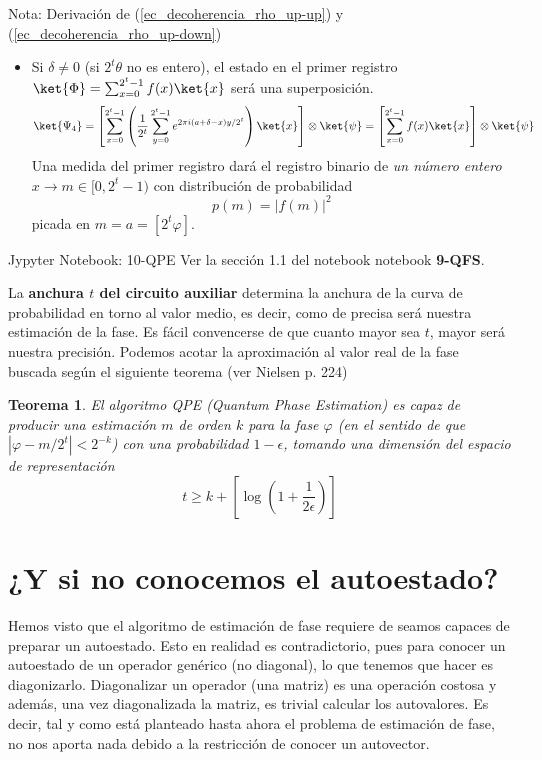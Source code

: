 \documentclass[a4paper,11pt]{book} %
\newtheorem{teorema_contador}{Teorema}
\newcommand{\Teorema}[1]{
		\begin{mybox_gray2}{}
			\begin{teorema_contador}
				 #1 
			\end{teorema_contador} 
		\end{mybox_gray2}
	}
\numberwithin{equation}{chapter}
\def\lc{\left[}
\def\rc{\right]}
\begin{document}
\begin{mybox_blue}{Nota: Derivación de (\ref{ec_decoherencia_rho_up-up}) y  (\ref{ec_decoherencia_rho_up-down})}
\begin{enumerate}
\begin{itemize}
		\item Si $\delta \neq 0$ (si $2^t \theta$ no es entero), el estado en el primer registro  $\ket{\Phi} = \sum_{x=0}^{2^t-1} f(x) \ket{x}$ será una superposición.
			$$
			\ket{\Psi_4} = \lc \sum_{x=0}^{2^t-1} \left( \frac{1}{2^{t}}\sum_{y=0}^{2^t-1}  e^{2\pi i (a + \delta  -x) y/2^t} \right) \ket{x} \rc \otimes \ket{\psi} = \lc \sum_{x=0}^{2^t-1} f(x) \ket{x} \rc \otimes \ket{\psi}
			$$
		Una medida del primer registro dará el registro binario de \textit{un número entero} $x \to m \in [0,2^t-1)$ con distribución de probabilidad 
			\begin{equation} \label{ec_QPE_p(m)}
			p(m) = |f(m)|^2
			\end{equation}		
		picada en $m=a=[2^t\varphi]$. 
	\end{itemize}

\end{enumerate}

	\begin{mybox_orange}{Jypyter Notebook: 10-QPE}
	Ver la sección 1.1 del notebook notebook \textbf{9-QFS}.
	\end{mybox_orange}


La \textbf{anchura $t$ del circuito auxiliar} determina la anchura de la curva de probabilidad en torno al valor medio, es decir, como de precisa será nuestra estimación de la fase. Es fácil convencerse de que cuanto mayor sea $t$, mayor será nuestra precisión. Podemos acotar la aproximación al valor real de la fase buscada según el siguiente teorema  (ver Nielsen \cite{nielsen} p. 224)

	\Teorema{
	El algoritmo QPE (Quantum Phase Estimation) es capaz de producir una \textit{estimación $m$ de orden $k$}  para la fase $\varphi$ (en el sentido de que  $|\varphi- m/2^t |<2^{-k}$) con una  probabilidad $1-\epsilon$,  tomando una dimensión del espacio de representación
	$$
	t \geq k  + \left[ \log\left(1 + \frac{1}{2\epsilon}\right) \right] 
	$$
	}


\section{¿Y si no conocemos el autoestado?}

Hemos visto que el algoritmo de estimación de fase requiere de seamos capaces de preparar un autoestado. Esto en realidad es contradictorio, pues para conocer un autoestado de un operador genérico (no diagonal), lo que tenemos que hacer es diagonizarlo. Diagonalizar un operador (una matriz) es una operación costosa y además, una vez diagonalizada la matriz, es trivial calcular los autovalores. Es decir, tal y como está planteado hasta ahora el problema de estimación de fase, no nos aporta nada debido a la restricción de conocer un autovector. 


\end{mybox_blue}
\end{document}
